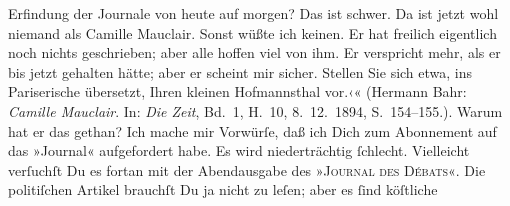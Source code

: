 \begin{ledgroupsized}[t]{13cm}
{{{                     Erfindung der Journale von heute auf morgen? Das ist schwer. Da ist jetzt wohl
                     niemand als Camille Mauclair. Sonst wüßte
                     ich keinen. Er hat freilich eigentlich noch nichts geschrieben; aber alle
                     hoffen viel von ihm. Er verspricht mehr, als er bis jetzt gehalten hätte; aber
                     er scheint mir sicher. Stellen Sie sich etwa, ins Pariserische übersetzt, Ihren kleinen Hofmannsthal vor.‹« (Hermann Bahr: \emph{Camille Mauclair}. In: \emph{Die Zeit}, Bd. 1, H. 10, 8. 12. 1894,
                  S. 154–155.)}}}\label{K_L02630-7h}. Warum hat er das gethan?\pend
           \pstart
           Ich mache mir Vorwürſe, daß ich Dich zum Abonnement auf das {\pb}»Journal« aufgefordert habe. Es wird niederträchtig ſchlecht. Vielleicht
               verſuchſt Du es fortan mit der Abendausgabe des »\textsc{Journal des Débats}«. Die politiſchen Artikel brauchſt Du ja nicht zu leſen; aber es ſind köſtliche

\end{ledgroupsized}
